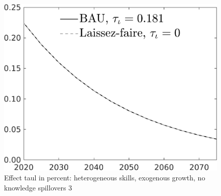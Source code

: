 \documentclass[12pt]{article}
\begin{document}
\begin{figure}[h!!]
	\centering
	\caption{Effect taul in percent: heterogeneous skills, exogenous growth, no knowledge spillovers 3}\label{fig:LF_BAU_nsk0_xgr1_noknow3}
	
	\begin{minipage}[]{0.32\textwidth}
		\includegraphics[width=1\textwidth]{../../codding_model/own_basedOnFried/optimalPol_010922_revision/figures/all_13Sept22/CompTaul_LFBAU_Reg0_pf_spillover0_nsk0_xgr1_knspil1_sep1_countec0_GovRev0_etaa0.79_lgd1.png}

\end{minipage}
\end{figure}
\end{document}
